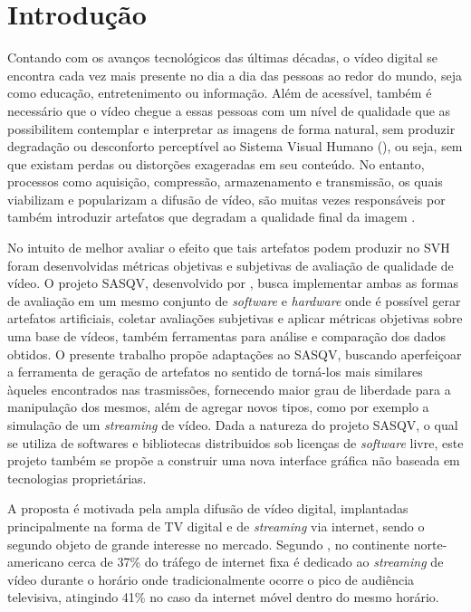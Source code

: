 \chapter{Introdução}

Contando com os avanços tecnológicos das últimas décadas, o vídeo digital se encontra cada vez mais presente no dia a dia das pessoas ao redor do mundo, seja como educação, entretenimento ou informação.
Além de acessível, também é necessário que o vídeo chegue a essas pessoas com um nível de qualidade que as possibilitem contemplar e interpretar as imagens de forma natural, sem produzir degradação ou desconforto perceptível ao Sistema Visual Humano (), ou seja, sem que existam perdas ou distorções exageradas em seu conteúdo.
No entanto, processos como aquisição, compressão, armazenamento e transmissão, os quais viabilizam e popularizam a difusão de vídeo, são muitas vezes responsáveis por também introduzir artefatos que degradam a qualidade final da imagem \cite{daronco}.

No intuito de melhor avaliar o efeito que tais artefatos podem produzir no SVH foram desenvolvidas métricas objetivas e subjetivas de avaliação de qualidade de vídeo. O projeto SASQV, desenvolvido por \cite{sasqv}, busca implementar ambas as formas de avaliação em um mesmo conjunto de \emph{software} e \emph{hardware} onde é possível gerar artefatos artificiais, coletar avaliações subjetivas e aplicar métricas objetivas sobre uma base de vídeos, também ferramentas para análise e comparação dos dados obtidos. O presente trabalho propõe adaptações ao SASQV, buscando aperfeiçoar a ferramenta de  geração de artefatos no sentido de torná-los mais similares àqueles encontrados nas trasmissões, fornecendo maior grau de liberdade para a manipulação dos mesmos, além de agregar novos tipos, como por exemplo a simulação de um \emph{streaming} de vídeo. Dada a natureza do projeto SASQV, o qual se utiliza de softwares e bibliotecas distribuidos sob licenças de \emph{software} livre, este projeto também se propõe a construir uma nova interface gráfica não baseada em tecnologias proprietárias.

A proposta é motivada pela ampla difusão de vídeo digital, implantadas principalmente na forma de TV digital e de \emph{streaming} via internet, sendo o segundo objeto de grande interesse no mercado. Segundo \cite{sandvinereport}, no continente norte-americano cerca de 37\% do tráfego de internet fixa é dedicado ao \emph{streaming} de vídeo durante o horário onde tradicionalmente ocorre o pico de audiência televisiva, atingindo 41\% no caso da internet móvel dentro do mesmo horário.

